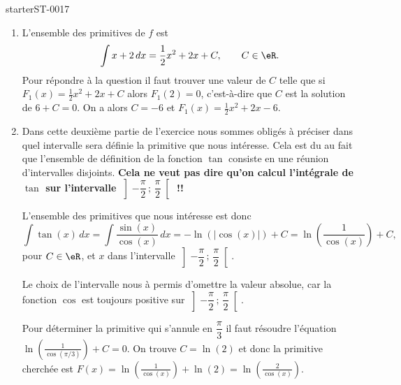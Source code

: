 
\begin{corrige}{starterST-0017}

\begin{enumerate}
  \item L'ensemble des primitives de $f$ est 
    \begin{equation*}
      \int x+2 \, dx = \frac{1}{2} x^2 + 2x + C, \qquad C \in \eR. 
    \end{equation*}
    Pour répondre à la question il faut trouver une valeur de $C$ telle que si $F_{1}(x)=\frac{1}{2} x^2 + 2x + C $ alors $F_{1}(2) = 0$, c'est-à-dire que $C$ est la solution de $6 + C = 0$. On a alors $C = -6$ et  $F_{1}(x)=\frac{1}{2} x^2 + 2x -6 $. 
    \item 
      \begin{Aretenir}
        Dans cette deuxième partie de l'exercice nous sommes obligés à préciser dans quel intervalle sera définie la primitive que nous intéresse. Cela est du au fait que l'ensemble de définition de la fonction $\tan$ consiste en une réunion d'intervalles disjoints. {\bf Cela ne veut pas dire qu'on calcul l'intégrale de $\tan$ sur l'intervalle $\left]-\dfrac{\pi}{2}\,;\,\dfrac{\pi}{2}\right[$ !!}
      \end{Aretenir}

      L'ensemble des primitives que nous intéresse est donc  
      \begin{equation*}
        \int \tan(x) \, dx = \int \frac{\sin(x)}{\cos(x)} \, dx = -\ln\left(|\cos(x)|\right)+C  = \ln\left(\frac{1}{\cos(x)}\right)+C,
      \end{equation*}
      pour $C \in \eR$, et $x$ dans  l'intervalle $\left]-\dfrac{\pi}{2}\,;\,\dfrac{\pi}{2}\right[$.
  
      Le choix de l'intervalle nous à permis d'omettre la valeur absolue, car la fonction $\cos$ est toujours positive sur $\left]-\dfrac{\pi}{2}\,;\,\dfrac{\pi}{2}\right[$.
    
            Pour déterminer la primitive qui s'annule en $\dfrac{\pi}{3}$ il faut résoudre l'équation $\ln\left(\frac{1}{\cos(\pi/3)}\right)+C = 0$. On trouve $C = \ln(2)$ et donc la primitive cherchée  est $F(x) = \ln\left(\frac{1}{\cos(x)}\right)+\ln(2) = \ln\left(\frac{2}{\cos(x)}\right)$.
  \end{enumerate}

\end{corrige}
